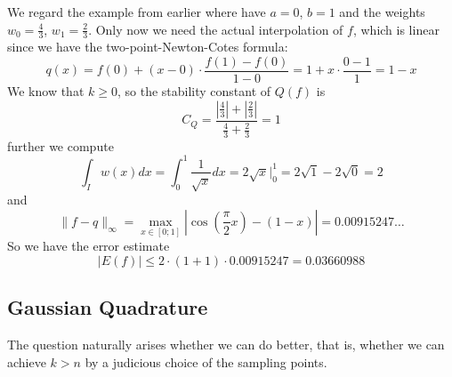 \begin{example}
   We regard the example from earlier where have \(a = 0\), \(b = 1\) and the weights \(w_0 = \frac{4}{3}\), \(w_1 = \frac{2}{3}\).
   Only now we need the actual interpolation of \(f\), which is linear since we have the two-point-Newton-Cotes formula:
   \[q(x) = f(0) + (x-0) \cdot \frac{f(1) - f(0)}{1 - 0} = 1 + x \cdot \frac{0-1}{1} = 1-x\]
   We know that \(k \geq 0\), so the stability constant of \(Q(f)\) is
   \[C_Q = \frac{\left|\frac{4}{3}\right| + \left|\frac{2}{3}\right|}{\frac{4}{3} + \frac{2}{3}} = 1\]
   further we compute
   \[\int_I w(x) dx = \int_0^1 \frac{1}{\sqrt{x}} dx = 2\sqrt{x}\rvert_0^1 = 2\sqrt{1} - 2\sqrt{0} = 2\]
   and
   \[\|f - q\|_\infty = \max_{x \in [0;1]} \left|\cos\left(\frac{\pi}{2}x\right) - (1 - x)\right| = 0.00915247\ldots\]
   So we have the error estimate
   \[|E(f)| \leq 2 \cdot (1 + 1) \cdot 0.00915247 = 0.03660988\]
\end{example}

\newpage

\subsection{Gaussian Quadrature}
The question naturally arises whether we can do better, that is, whether we can achieve \(k > n\) by a judicious choice of the sampling points.

